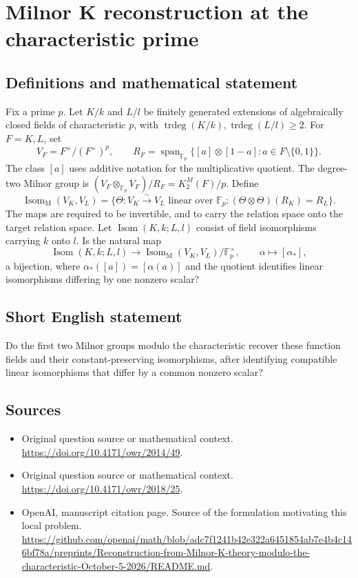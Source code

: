 \documentclass[11pt]{article}
\begin{document}
\section*{Milnor K reconstruction at the characteristic prime}\label{30007268}
\subsection{Definitions and mathematical statement}
Fix a prime $p$. Let $K/k$ and $L/l$ be finitely generated extensions of algebraically closed fields of characteristic $p$, with $\operatorname{trdeg}(K/k),\operatorname{trdeg}(L/l)\ge2$. For $F=K,L$, set
\[
 V_F=F^\times/(F^\times)^p,\qquad
 R_F=\operatorname{span}_{\mathbb F_p}\{[a]\otimes[1-a]:a\in F\setminus\{0,1\}\}.
\]
The class $[a]$ uses additive notation for the multiplicative quotient. The degree-two Milnor group is $(V_F\otimes_{\mathbb F_p}V_F)/R_F=K_2^M(F)/p$. Define
\[
 \operatorname{Isom}_{\mathrm M}(V_K,V_L)
 =\{\Theta:V_K\xrightarrow{\sim}V_L\text{ linear over }\mathbb F_p:
           (\Theta\otimes\Theta)(R_K)=R_L\}.
\]
The maps are required to be invertible, and to carry the relation space onto the target relation space. Let $\operatorname{Isom}(K,k;L,l)$ consist of field isomorphisms carrying $k$ onto $l$. Is the natural map
\[
 \operatorname{Isom}(K,k;L,l)\longrightarrow
 \operatorname{Isom}_{\mathrm M}(V_K,V_L)/\mathbb F_p^\times,
 \qquad\alpha\longmapsto[\alpha_*],
\]
a bijection, where $\alpha_*([a])=[\alpha(a)]$ and the quotient identifies linear isomorphisms differing by one nonzero scalar?

\subsection{Short English statement}
Do the first two Milnor groups modulo the characteristic recover these function fields and their constant-preserving isomorphisms, after identifying compatible linear isomorphisms that differ by a common nonzero scalar?

\subsection{Sources}
\begin{itemize}
\item[S1] Original question source or mathematical context.
\url{https://doi.org/10.4171/owr/2014/49}.
\item[S2] Original question source or mathematical context.
\url{https://doi.org/10.4171/owr/2018/25}.
\item[S3] OpenAI, manuscript citation page. Source of the formulation motivating this local problem.
\url{https://github.com/openai/math/blob/adc7f1241b42e322a6451854ab7e4b4c146bf78a/preprints/Reconstruction-from-Milnor-K-theory-modulo-the-characteristic-October-5-2026/README.md}.
\end{itemize}
\end{document}
